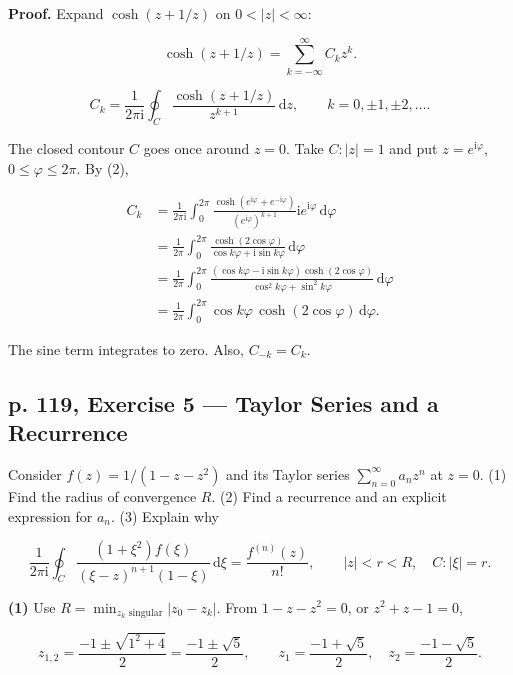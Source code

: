 \documentclass[11pt,a4paper]{article}
\theoremstyle{definition}
\theoremstyle{plain}
\begin{document}
\textbf{Proof.} Expand $\cosh(z+1/z)$ on $0<|z|<\infty$:

\begin{equation*}
\cosh(z+1/z)=\sum_{k=-\infty}^{\infty}C_kz^k. \tag{1}
\end{equation*}

\begin{equation*}
C_k=\frac1{2\pi \mathrm{i}}\oint_C\frac{\cosh(z+1/z)}{z^{k+1}}\,\mathrm{d}z,\qquad
k=0,\pm1,\pm2,\ldots. \tag{2}
\end{equation*}

The closed contour $C$ goes once around $z=0$. Take $C:|z|=1$ and put $z=e^{\mathrm{i}\varphi}$, $0\le\varphi\le2\pi$. By (2),

\[
\begin{aligned}
C_k&=\frac1{2\pi \mathrm{i}}\int_0^{2\pi}
\frac{\cosh(e^{\mathrm{i}\varphi}+e^{-\mathrm{i}\varphi})}{(e^{\mathrm{i}\varphi})^{k+1}}\mathrm{i} e^{\mathrm{i}\varphi}\,\mathrm{d}\varphi\\
&=\frac1{2\pi}\int_0^{2\pi}\frac{\cosh(2\cos\varphi)}{\cos k\varphi+\mathrm{i}\sin k\varphi}\,\mathrm{d}\varphi\\
&=\frac1{2\pi}\int_0^{2\pi}
\frac{(\cos k\varphi-\mathrm{i}\sin k\varphi)\cosh(2\cos\varphi)}
{\cos^2 k\varphi+\sin^2 k\varphi}\,\mathrm{d}\varphi\\
&=\frac1{2\pi}\int_0^{2\pi}\cos k\varphi\,\cosh(2\cos\varphi)\,\mathrm{d}\varphi.
\end{aligned}
\]

The sine term integrates to zero. Also, $C_{-k}=C_k$.


\subsection{p. 119, Exercise 5 --- Taylor Series and a Recurrence}

Consider $f(z)=1/(1-z-z^2)$ and its Taylor series $\sum_{n=0}^{\infty}a_nz^n$ at $z=0$. (1) Find the radius of convergence $R$. (2) Find a recurrence and an explicit expression for $a_n$. (3) Explain why

\[
\frac1{2\pi \mathrm{i}}\oint_C
\frac{(1+\xi^2)f(\xi)}{(\xi-z)^{n+1}(1-\xi)}\,\mathrm{d}\xi
=\frac{f^{(n)}(z)}{n!},
\qquad |z|<r<R,\quad C:|\xi|=r.
\]

\textbf{(1)} Use $R=\min_{z_k\text{ singular}}|z_0-z_k|$. From $1-z-z^2=0$, or $z^2+z-1=0$,

\[
z_{1,2}=\frac{-1\pm\sqrt{1^2+4}}2=\frac{-1\pm\sqrt5}2,
\qquad z_1=\frac{-1+\sqrt5}2,\quad z_2=\frac{-1-\sqrt5}2.
\]
\end{document}
